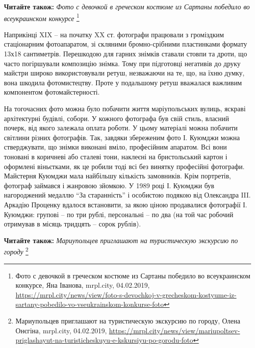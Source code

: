 
\textbf{Читайте також:} \emph{Фото с девочкой в греческом костюме из Сартаны победило во всеукраинском конкурсе}%
\footnote{Фото с девочкой в греческом костюме из Сартаны победило во всеукраинском конкурсе, Яна Іванова, mrpl.city, 04.02.2019, %
\url{https://mrpl.city/news/view/foto-s-devochkoj-v-grecheskom-kostyume-iz-sartany-pobedilo-vo-vseukrainskom-konkurse-foto}
}

Наприкінці XIX – на початку XX ст. фотографи працювали з громіздким
стаціонарним фотоапаратом, зі скляними бромно-срібними пластинками формату
13х18 сантиметрів. Перешкодою для гарних знімків ставали стовпи та дроти, що
часто погіршували композицію знімка. Тому при підготовці негативів до друку
майстри широко використовували ретуш, незважаючи на те, що, на їхню думку, вона
шкодила фотомистецтву. Проте у подальшому ретуш вважалася важливим компонентом
фотомайстерності.


На тогочасних фото можна було побачити життя маріупольських вулиць, яскраві
архітектурні будівлі, собори. У кожного фотографа був свій стиль, власний
почерк, від якого залежала оплата роботи. У цьому матеріалі можна побачити
світлини різних фотографів. Так, завдяки збереженим фото І. Куюмджи можна
стверджувати, що знімки виконані вміло, професійним апаратом. Всі вони тоновані
в коричневі або сталеві тони, наклеєні на бристольський картон і оформлені
віньєтками, як це робили тоді всі без винятку професійні фотографи. Майстерня
Куюмджи мала найбільшу кількість замовників. Крім портретів, фотограф займався
і жанровою зйомкою. У 1989 році І. Куюмджи був нагороджений медаллю \enquote{За
старанність} і особистою подякою від Олександра III. Аркадію Проценку вдалося
встановити, за якою ціною продавалися фотографії І. Куюмджи: групові – по три
рублі, персональні – по два (на той час робочий отримував в місяць тридцять –
сорок рублів).

\textbf{Читайте також:} \emph{Мариупольцев приглашают на туристическую экскурсию по городу}%
\footnote{Мариупольцев приглашают на туристическую экскурсию по городу, Олена Онєгіна, mrpl.city, 04.02.2019, \url{https://mrpl.city/news/view/mariupoltsev-priglashayut-na-turisticheskuyu-e-kskursiyu-po-gorodu-foto}}



